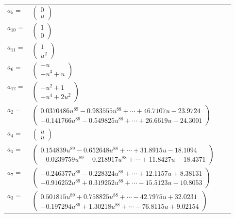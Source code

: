 \documentclass[1p]{elsarticle_modified}
\theoremstyle{definition}
\begin{document}
\begin{tabular}{m{7pt} m{180pt} m{7pt} m{180pt} }
\flushright $a_{5}=$&$\begin{pmatrix}0\\u\end{pmatrix}$ \\
\flushright $a_{10}=$&$\begin{pmatrix}1\\0\end{pmatrix}$ \\
\flushright $a_{11}=$&$\begin{pmatrix}1\\u^2\end{pmatrix}$ \\
\flushright $a_{6}=$&$\begin{pmatrix}- u\\- u^3+u\end{pmatrix}$ \\
\flushright $a_{12}=$&$\begin{pmatrix}- u^2+1\\- u^4+2 u^2\end{pmatrix}$ \\
\flushright $a_{2}=$&$\begin{pmatrix}0.0370486 u^{89}-0.983555 u^{88}+\cdots+46.7107 u-23.9724\\-0.141766 u^{89}-0.549825 u^{88}+\cdots+26.6619 u-24.3001\end{pmatrix}$ \\
\flushright $a_{4}=$&$\begin{pmatrix}u\\u\end{pmatrix}$ \\
\flushright $a_{1}=$&$\begin{pmatrix}0.154839 u^{89}-0.652648 u^{88}+\cdots+31.8915 u-18.1094\\-0.0239759 u^{89}-0.218917 u^{88}+\cdots+11.8427 u-18.4371\end{pmatrix}$ \\
\flushright $a_{7}=$&$\begin{pmatrix}-0.246377 u^{89}-0.228324 u^{88}+\cdots+12.1157 u+8.38131\\-0.916252 u^{89}+0.319252 u^{88}+\cdots-15.5123 u-10.8053\end{pmatrix}$ \\
\flushright $a_{3}=$&$\begin{pmatrix}0.501815 u^{89}+0.758825 u^{88}+\cdots-42.7975 u+32.0231\\-0.197294 u^{89}+1.30218 u^{88}+\cdots-76.8115 u+9.02154\end{pmatrix}$ \\

\end{tabular}
\end{document}
